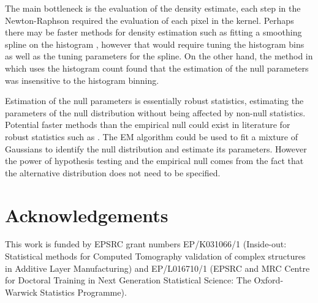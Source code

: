 \documentclass{proc}
\begin{document}
The main bottleneck is the evaluation of the density estimate, each step in the Newton-Raphson required the evaluation of each pixel in the kernel. Perhaps there may be faster methods for density estimation such as fitting a smoothing spline on the histogram \citep{efron2004large}, however that would require tuning the histogram bins as well as the tuning parameters for the spline. On the other hand, the method in \cite{schwartzman2008empirical} which uses the histogram count found that the estimation of the null parameters was insensitive to the histogram binning.

Estimation of the null parameters is essentially robust statistics, estimating the parameters of the null distribution without being affected by non-null statistics. Potential faster methods than the empirical null could exist in literature for robust statistics such as \cite{hampel1986robust, rousseeuw1987robust, maronna2006robust, huber2009robust, jewson2018principles}. The EM algorithm \citep{dempster1977maximum} could be used to fit a mixture of Gaussians to identify the null distribution and estimate its parameters. However the power of hypothesis testing and the empirical null comes from the fact that the alternative distribution does not need to be specified.

\section{Acknowledgements}
This work is funded by EPSRC grant numbers EP/K031066/1 (Inside-out: Statistical methods for Computed Tomography validation of complex structures in Additive Layer Manufacturing) and EP/L016710/1 (EPSRC and MRC Centre for Doctoral Training in Next Generation Statistical Science: The Oxford-Warwick Statistics Programme).



\end{document}
